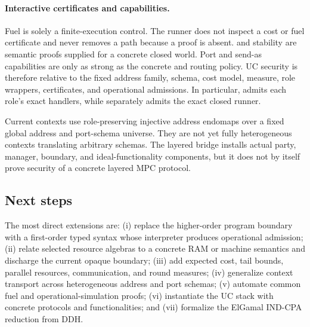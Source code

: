 \paragraph{Interactive certificates and capabilities.}
Fuel is solely a finite-execution control.  The runner does not inspect a cost
or fuel certificate and never removes a path because a proof is absent.
 and stability are semantic proofs supplied for
a concrete closed world.  Port and send-as capabilities are only as strong as
the concrete  and routing policy.  UC security is therefore
relative to the fixed address family, schema, cost model, measure, role
wrappers, certificates, and operational admissions.  In particular,
 admits each role's exact handlers, while
 separately admits the exact closed runner.

Current contexts use role-preserving injective address endomaps over a fixed
global address and port-schema universe.  They are not yet fully heterogeneous
contexts translating arbitrary schemas.  The layered bridge installs actual
party, manager, boundary, and ideal-functionality components, but it does not
by itself prove security of a concrete layered MPC protocol.

\subsection{Next steps}

The most direct extensions are: (i) replace the higher-order program boundary
with a first-order typed syntax whose interpreter produces operational
admission; (ii) relate selected resource algebras to a concrete RAM or machine
semantics and discharge the current opaque boundary; (iii) add expected cost, tail bounds,
parallel resources, communication, and round measures; (iv) generalize context
transport across heterogeneous address and port schemas; (v) automate common
fuel and operational-simulation proofs; (vi) instantiate the UC stack with
concrete protocols and functionalities; and (vii) formalize the ElGamal
IND-CPA reduction from DDH.
